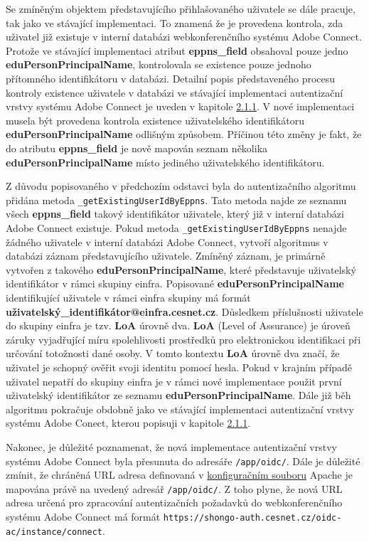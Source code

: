 \documentclass[
  printed, %
  twoside, %
  table,   %
  nolof,     %
  nolot,     %
]{fithesis3}
\begin{document}
Se zmíněným objektem představujícího přihlašovaného uživatele se dále pracuje, tak jako ve stávající implementaci. To znamená že je provedena kontrola, zda uživatel již existuje v interní databázi webkonferenčního systému Adobe Connect. Protože ve stávající implementaci atribut \textbf{eppns\_field} obsahoval pouze jedno \textbf{eduPersonPrincipalName}, kontrolovala se existence pouze jednoho přítomného identifikátoru v databázi. Detailní popis představeného procesu kontroly existence uživatele v databázi ve stávající implementaci autentizační vrstvy systému Adobe Connect je uveden v kapitole \hyperref[ac-old]{2.1.1}. V nové implementaci musela být provedena kontrola existence uživatelského identifikátoru \textbf{eduPersonPrincipalName} odlišným způsobem. Příčinou této změny je fakt, že do atributu \textbf{eppns\_field} je nově mapován seznam několika \textbf{eduPersonPrincipalName} místo jediného uživatelského identifikátoru.
\par
Z důvodu popisovaného v předchozím odstavci byla do autentizačního algoritmu přidána metoda \texttt{\_getExistingUserIdByEppns}. Tato metoda najde ze seznamu všech \textbf{eppns\_field} takový identifikátor uživatele, který již v interní databázi Adobe Connect existuje. Pokud metoda \texttt{\_getExistingUserIdByEppns} nenajde žádného uživatele v interní databázi Adobe Connect, vytvoří algoritmus v databázi záznam představujícího uživatele. Zmíněný záznam, je primárně vytvořen z takového \textbf{eduPersonPrincipalName}, které představuje uživatelský identifikátor v rámci skupiny einfra. Popisované \textbf{eduPersonPrincipalName} identifikující uživatele v rámci einfra skupiny má formát \textbf{{uživatelský\_identifikátor}@einfra.cesnet.cz}. Důsledkem příslušnosti uživatele do skupiny einfra je tzv. \textbf{LoA} úrovně dva. \textbf{LoA} (Level of Assurance) \cite{rfc6711} je úroveň záruky vyjadřující míru spolehlivosti prostředků pro
elektronickou identifikaci při určování totožnosti dané osoby. V tomto kontextu \textbf{LoA} úrovně dva značí, že uživatel je schopný ověřit svoji identitu pomocí hesla.  Pokud v krajním případě uživatel nepatří do skupiny einfra je v rámci nové implementace použit první uživatelský identifikátor ze seznamu \textbf{eduPersonPrincipalName}. Dále již běh algoritmu pokračuje obdobně jako ve stávající implementaci autentizační vrstvy systému Adobe Conect, kterou popisuji v kapitole \hyperref[ac-old]{2.1.1}. 


\par 
Nakonec, je důležité poznamenat, že nová implementace autentizační vrstvy systému Adobe Connect byla přesunuta do adresáře \texttt{/app/oidc/}. Dále je důležité zmínit, že chráněná URL adresa definovaná v \hyperref[ac-location]{konfiguračním souboru} Apache je mapována právě na uvedený adresář \texttt{/app/oidc/}. Z toho plyne, že nová URL adresa určená pro zpracování autentizačních požadavků do webkonferenčního systému Adobe Connect má formát \texttt{https://shongo-auth.cesnet.cz/oidc-ac/instance/connect}.
\end{document}
